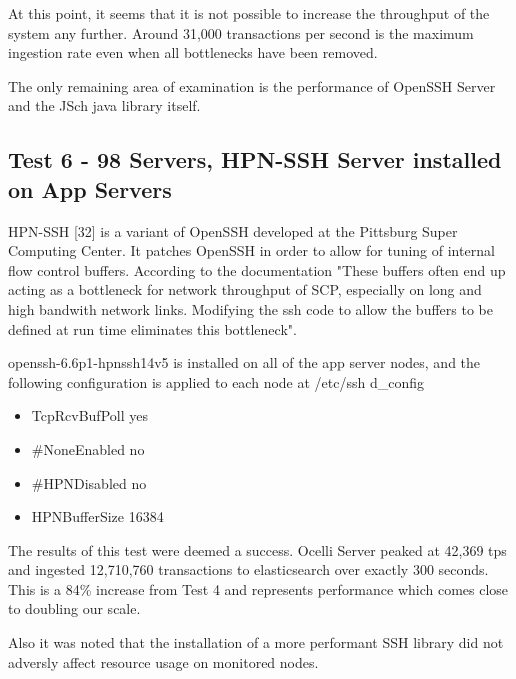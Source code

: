 \documentclass{llncs}
\begin{document}
At this point, it seems that it is not possible to increase the throughput of the system any further. Around 31,000 transactions per second is the maximum ingestion rate even when all bottlenecks have been removed. 

The only remaining area of examination is the performance of OpenSSH Server and the JSch java library itself.

\subsection{Test 6 - 98 Servers, HPN-SSH Server installed on App Servers}

HPN-SSH [32] is a variant of OpenSSH developed at the Pittsburg Super Computing Center. It patches OpenSSH in order to allow for tuning of internal flow control buffers. According to the documentation "These buffers often end up acting as a bottleneck for network throughput of SCP, especially on long and high bandwith network links. Modifying the ssh code to allow the buffers to be defined at run time eliminates this bottleneck".

openssh-6.6p1-hpnssh14v5 is installed on all of the app server nodes, and the following configuration is applied to each node at /etc/ssh d\_config

\begin{itemize}
\item TcpRcvBufPoll yes
\item \#NoneEnabled no
\item \#HPNDisabled no
\item HPNBufferSize 16384
\end{itemize}

The results of this test were deemed a success.  Ocelli Server peaked at 42,369 tps and ingested 12,710,760 transactions to elasticsearch over exactly 300 seconds. This is a 84\% increase from Test 4 and represents performance which comes close to doubling our scale.

Also it was noted that the installation of a more performant SSH library did not adversly affect resource usage on monitored nodes.
\end{document}
